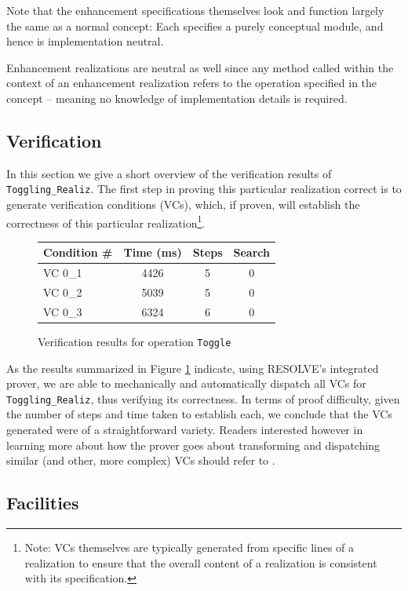 Note that the enhancement specifications themselves look and function largely the same as a normal concept: Each specifies a purely conceptual module, and hence is implementation neutral. 

Enhancement realizations are neutral as well since any method called within the context of an enhancement realization refers to the operation specified in the concept -- meaning no knowledge of implementation details is required.

\subsection{Verification}

In this section we give a short overview of the verification results of \texttt{Toggling\_Realiz}. The first step in proving this particular realization correct is to generate verification conditions (VCs), which, if proven, will establish the correctness of this particular realization\footnote{Note: VCs themselves are typically generated from specific lines of a realization to ensure that the overall content of a realization is consistent with its specification.}.

\begin{figure}[!htb]
\centering
\begin{tabular}{lccc}
	\toprule
	Condition \# & Time (ms)	& Steps	& Search \\
	\midrule
	VC 0\_1	& 4426	& 5	& 0	\\
	VC 0\_2	& 5039	& 5	& 0	\\
	VC 0\_3	& 6324	& 6	& 0	\\
	\bottomrule
\end{tabular}
\caption{Verification results for operation \texttt{Toggle}}
\label{fig:results}
\end{figure}

As the results summarized in Figure \ref{fig:results} indicate, using RESOLVE's integrated prover, we are able to mechanically and automatically dispatch all VCs for \texttt{Toggling\_Realiz}, thus verifying its correctness. In terms of proof difficulty, given the number of steps and time taken to establish each, we conclude that the VCs generated were of a straightforward variety. Readers interested however in learning more about how the prover goes about transforming and dispatching similar (and other, more complex) VCs should refer to \cite{smith:2013}.

\subsection{Facilities}
\label{sec:facilities}

